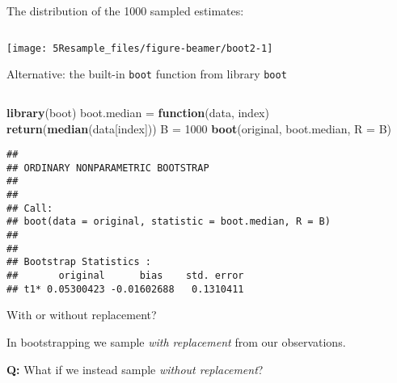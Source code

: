\documentclass[10pt,ignorenonframetext,]{beamer}
\newenvironment{Shaded}{\begin{snugshade}}{\end{snugshade}}
\newcommand{\ControlFlowTok}[1]{\textcolor[rgb]{0.13,0.29,0.53}{\textbf{#1}}}
\newcommand{\DataTypeTok}[1]{\textcolor[rgb]{0.13,0.29,0.53}{#1}}
\newcommand{\DecValTok}[1]{\textcolor[rgb]{0.00,0.00,0.81}{#1}}
\newcommand{\KeywordTok}[1]{\textcolor[rgb]{0.13,0.29,0.53}{\textbf{#1}}}
\newcommand{\NormalTok}[1]{#1}
\newcommand{\StringTok}[1]{\textcolor[rgb]{0.31,0.60,0.02}{#1}}
\begin{document}
\begin{frame}

The distribution of the 1000 sampled estimates:

\(~\)

\begin{center}\texttt{[image: 5Resample\_files/figure-beamer/boot2-1]} \end{center}

\end{frame}

\begin{frame}[fragile]

\begin{block}{Alternative: the built-in \texttt{boot} function from
library \texttt{boot}}

\(~\)

\scriptsize

\begin{Shaded}
\begin{Highlighting}[]
\KeywordTok{library}\NormalTok{(boot)}
\NormalTok{boot.median =}\StringTok{ }\ControlFlowTok{function}\NormalTok{(data, index) }\KeywordTok{return}\NormalTok{(}\KeywordTok{median}\NormalTok{(data[index]))}
\NormalTok{B =}\StringTok{ }\DecValTok{1000}
\KeywordTok{boot}\NormalTok{(original, boot.median, }\DataTypeTok{R =}\NormalTok{ B)}
\end{Highlighting}
\end{Shaded}

\begin{verbatim}
## 
## ORDINARY NONPARAMETRIC BOOTSTRAP
## 
## 
## Call:
## boot(data = original, statistic = boot.median, R = B)
## 
## 
## Bootstrap Statistics :
##       original      bias    std. error
## t1* 0.05300423 -0.01602688   0.1310411
\end{verbatim}

\end{block}

\end{frame}

\begin{frame}

\begin{block}{With or without replacement?}

\vspace{2mm}

In bootstrapping we sample \emph{with replacement} from our
observations.

\vspace{4mm}

\textbf{Q:} What if we instead sample \emph{without replacement}?

\vspace{2mm}

\vspace{4mm}

\end{block}

\end{frame}
\end{document}
